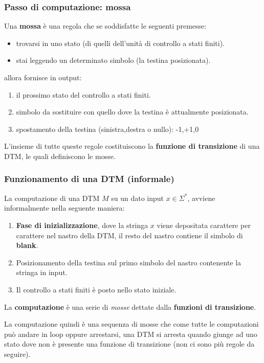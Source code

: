 \documentclass{article}
\begin{document}
\subsubsection{Passo di computazione: mossa}
Una \textbf{mossa} è una regola che se soddisfatte le seguenti premesse:
\begin{itemize}
    \item trovarsi in uno stato (di quelli dell'unità di controllo a stati finiti).
    \item stai leggendo un determinato simbolo (la testina posizionata).
\end{itemize}
allora fornisce in output:
\begin{enumerate}
    \item il prossimo stato del controllo a stati finiti.
    \item simbolo da sostituire con quello dove la testina è attualmente posizionata.
    \item spostamento della testina (sinistra,destra o nullo): -1,+1,0
\end{enumerate}
L'insieme di tutte queste regole costituiscono la \textbf{funzione di transizione} di una
DTM, le quali definiscono le mosse.

\subsubsection{Funzionamento di una DTM (informale)}
La computazione di una DTM $M$ su un dato input $x\in\Sigma^*$, avviene
informalmente nella seguente maniera:
\begin{enumerate}
    \item \textbf{Fase di inizializzazione}, dove la stringa $x$ viene depositata carattere
            per carattere nel nastro della DTM, il resto del nastro contiene il simbolo di \textbf{blank}.
    \item Posizionamento della testina sul primo simbolo del nastro contenente la stringa in input.
    \item Il controllo a stati finiti è posto nello stato iniziale.
\end{enumerate}
La \textbf{computazione} è una serie di \textit{mosse} dettate dalla \textbf{funzioni di transizione}.

La computazione quindi è una sequenza di mosse che come tutte le computazioni può andare
in loop oppure arrestarsi, una DTM si arresta quando giunge ad uno
stato dove non è presente una funzione di transizione (non ci sono più regole da seguire).
\end{document}
